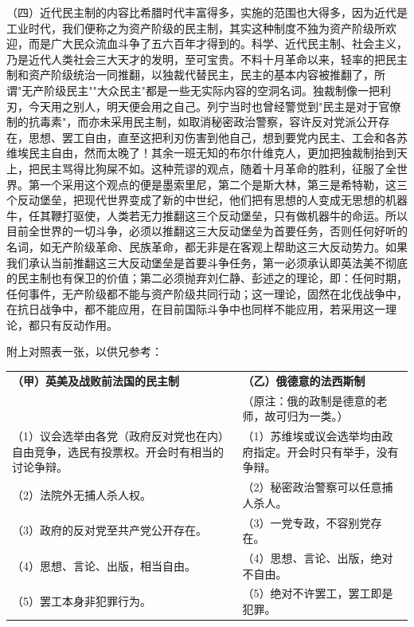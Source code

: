 \documentclass[
  openany,           %
  12pt,              %
  a4paper            %
]{ctexbook}
\begin{document}
（四）近代民主制的内容比希腊时代丰富得多，实施的范围也大得多，因为近代是工业时代，我们便称之为资产阶级的民主制，其实这种制度不独为资产阶级所欢迎，而是广大民众流血斗争了五六百年才得到的。科学、近代民主制、社会主义，乃是近代人类社会三大天才的发明，至可宝贵。不料十月革命以来，轻率的把民主制和资产阶级统治一同推翻，以独裁代替民主，民主的基本内容被推翻了，所谓"无产阶级民主""大众民主"都是一些无实际内容的空洞名词。独裁制像一把利刃，今天用之别人，明天便会用之自己。列宁当时也曾经警觉到"民主是对于官僚制的抗毒素"，而亦未采用民主制，如取消秘密政治警察，容许反对党派公开存在，思想、罢工自由，直至这把利刃伤害到他自己，想到要党内民主、工会和各苏维埃民主自由，然而太晚了！其余一班无知的布尔什维克人，更加把独裁制抬到天上，把民主骂得比狗屎不如。这种荒谬的观点，随着十月革命的胜利，征服了全世界。第一个采用这个观点的便是墨索里尼，第二个是斯大林，第三是希特勒，这三个反动堡垒，把现代世界变成了新的中世纪，他们把有思想的人变成无思想的机器牛，任其鞭打驱使，人类若无力推翻这三个反动堡垒，只有做机器牛的命运。所以目前全世界的一切斗争，必须以推翻这三大反动堡垒为首要任务，否则任何好听的名词，如无产阶级革命、民族革命，都无非是在客观上帮助这三大反动势力。如果我们承认当前推翻这三大反动堡垒是首要斗争任务，第一必须承认即英法美不彻底的民主制也有保卫的价值；第二必须抛弃刘仁静、彭述之的理论，即：任何时期，任何事件，无产阶级都不能与资产阶级共同行动；这一理论，固然在北伐战争中，在抗日战争中，都不能应用，在目前国际斗争中也同样不能应用，若采用这一理论，都只有反动作用。

附上对照表一张，以供兄参考：

\begin{center}
\small
\begin{tabularx}{\textwidth}{|X|X|}
\hline
\textbf{（甲）英美及战败前法国的民主制} & \textbf{（乙）俄德意的法西斯制} \\
& \small（原注：俄的政制是德意的老师，故可归为一类。）\\
\hline
（1）议会选举由各党（政府反对党也在内）自由竞争，选民有投票权。开会时有相当的讨论争辩。 & （1）苏维埃或议会选举均由政府指定。开会时只有举手，没有争辩。 \\
\hline
（2）法院外无捕人杀人权。 & （2）秘密政治警察可以任意捕人杀人。 \\
\hline
（3）政府的反对党至共产党公开存在。 & （3）一党专政，不容别党存在。 \\
\hline
（4）思想、言论、出版，相当自由。 & （4）思想、言论、出版，绝对不自由。 \\
\hline
（5）罢工本身非犯罪行为。 & （5）绝对不许罢工，罢工即是犯罪。 \\
\hline
\end{tabularx}
\end{center}
\end{document}
